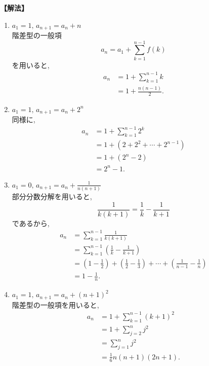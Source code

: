 \documentclass[dvipdfmx,a4paper,11pt,fleqn,openany]{jsbook}
\begin{document}
      \noindent\textbf{【解法】}
      \begin{enumerate}[label=(\arabic*),parsep=3pt]
        \item $\displaystyle a_1=1,\,a_{n+1}=a_n+n$\\
              階差型の一般項
              \[
                a_n=a_1+\sum_{k=1}^{n-1}f(k)
              \]
              を用いると,
              \begin{align*}
                a_n
                  &=1+\sum_{k=1}^{n-1}k\\
                  &=1+\frac{n(n-1)}{2}.
              \end{align*}

        \item $\displaystyle a_1=1,\,a_{n+1}=a_n+2^n$\\
              同様に,
              \begin{align*}
                a_n
                  &=1+\sum_{k=1}^{n-1}2^k\\
                  &=1+(2+2^2+\cdots+2^{n-1})\\
                  &=1+(2^n-2)\\
                  &=2^n-1.
              \end{align*}

        \item $\displaystyle a_1=0,\,a_{n+1}=a_n+\frac{1}{n(n+1)}$\\
              部分分数分解を用いると,
              \[
                \frac{1}{k(k+1)}
                =\frac{1}{k}-\frac{1}{k+1}
              \]
              であるから,
              \begin{align*}
                a_n
                  &=\sum_{k=1}^{n-1}\frac{1}{k(k+1)}\\
                  &=\sum_{k=1}^{n-1}
                    \left(\frac{1}{k}-\frac{1}{k+1}\right)\\
                  &=\left(1-\frac12\right)
                    +\left(\frac12-\frac13\right)
                    +\cdots
                    +\left(\frac{1}{n-1}-\frac1n\right)\\
                  &=1-\frac1n.
              \end{align*}

        \item $\displaystyle a_1=1,\,a_{n+1}=a_n+(n+1)^2$\\
              階差型の一般項を用いると,
              \begin{align*}
                a_n
                  &=1+\sum_{k=1}^{n-1}(k+1)^2\\
                  &=1+\sum_{j=2}^{n}j^2\\
                  &=\sum_{j=1}^{n}j^2\\
                  &=\frac{1}{6}n(n+1)(2n+1).
              \end{align*}
      \end{enumerate}
\end{document}
